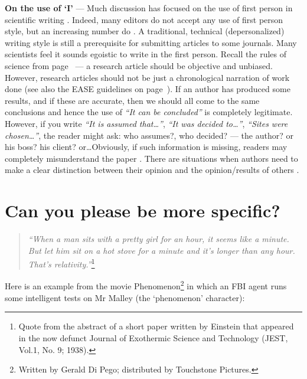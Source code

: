 \documentclass[graybox,envcountchap,sectrefs,UStrade]{svmono}
\newenvironment{fminipage}{\begin{Sbox}\begin{minipage}}{\end{minipage}\end{Sbox}\fbox{\TheSbox}}
\begin{document}
\bigskip
\begin{fminipage}{.9\textwidth}{\footnotesize{\textsf{\textbf{On the use of `I'}} --- Much discussion has focused on the use of first person in scientific writing \citep{Raymond1993CCC}. Indeed, many editors do not accept any use of first person style, but an increasing number do \citep{Kirkman2001ESE,Kirkman2004S}. A traditional, technical (depersonalized) writing style is still a prerequisite for submitting articles to some  journals. Many scientists feel it sounds egoistic to write in the first person. Recall the rules of science from page~\pageref{F:rules} --- a research article should be objective and unbiased. However, research articles should not be just a chronological narration of work done (see also the EASE guidelines on page~\pageref{sec:EASEguidelines}). If an author has produced some results, and if these are accurate, then we should all come to the same conclusions and hence the use of \emph{``It can be concluded''} is completely legitimate. However, if you write \emph{``It is assumed that\ldots ''}, \emph{``It was decided to\dots ''}, \emph{``Sites were chosen\ldots  ''}, the reader might ask: who assumes?, who decided? --- the author? or his boss? his client? or\ldots  Obviously, if such information is missing, readers may completely misunderstand the paper \citep{Webster2003EJSS}. There are situations when authors need to make a clear distinction between their opinion and the opinion/results of others \citep{Kirkman2001ESE}.}}
\end{fminipage}
\bigskip

\section{Can you please be more specific?}\label{sec:specific}

\begin{quote}
    \emph{``When a man sits with a pretty girl for an hour, it seems like a minute. But let him sit on a hot stove for a minute and it's longer than any hour. That's relativity.''}\footnote{Quote from the abstract of a short paper written by Einstein that appeared in the now defunct Journal of Exothermic Science and Technology (JEST, Vol.\@ 1, No. 9; 1938).}
\end{quote}

Here is an example from the movie Phenomenon\footnote{Written by Gerald Di Pego; distributed by Touchstone Pictures.} in which an FBI agent runs some intelligent tests on Mr Malley (the `phenomenon' character):
\end{document}
